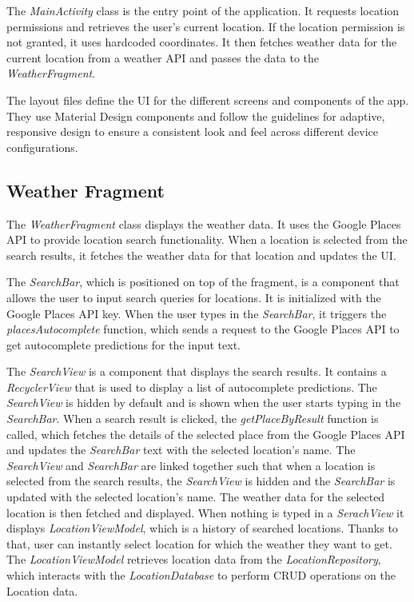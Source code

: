 The \textit{MainActivity} class is the entry point of the application. It requests location permissions and retrieves the user's current location. If the location permission is not granted, it uses hardcoded coordinates. It then fetches weather data for the current location from a weather API and passes the data to the \textit{WeatherFragment}.

The layout files define the UI for the different screens and components of the app. They use Material Design components and follow the guidelines for adaptive, responsive design to ensure a consistent look and feel across different device configurations.

\subsection{Weather Fragment}

The \textit{WeatherFragment} class displays the weather data. It uses the Google Places API to provide location search functionality. When a location is selected from the search results, it fetches the weather data for that location and updates the UI.

The \textit{SearchBar}, which is positioned on top of the fragment, is a component that allows the user to input search queries for locations. It is initialized with the Google Places API key. When the user types in the \textit{SearchBar}, it triggers the \textit{placesAutocomplete} function, which sends a request to the Google Places API to get autocomplete predictions for the input text. 

The \textit{SearchView} is a component that displays the search results. It contains a \textit{RecyclerView} that is used to display a list of autocomplete predictions. The \textit{SearchView} is hidden by default and is shown when the user starts typing in the \textit{SearchBar}. When a search result is clicked, the \textit{getPlaceByResult} function is called, which fetches the details of the selected place from the Google Places API and updates the \textit{SearchBar} text with the selected location's name. The \textit{SearchView} and \textit{SearchBar} are linked together such that when a location is selected from the search results, the \textit{SearchView} is hidden and the \textit{SearchBar} is updated with the selected location's name. The weather data for the selected location is then fetched and displayed. When nothing is typed in a \textit{SerachView} it displays \textit{LocationViewModel}, which is a history of searched locations. Thanks to that, user can instantly select location for which the weather they want to get. The \textit{LocationViewModel} retrieves location data from the \textit{LocationRepository}, which interacts with the \textit{LocationDatabase} to perform CRUD operations on the Location data. 

